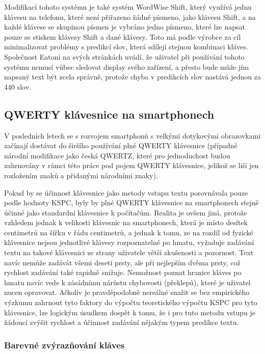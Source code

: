 \documentclass{article}
\begin{document}
Modifikací tohoto systému je také systém WordWise Shift, který využívá jednu klávesu na telefonu, které není přiřazeno žádné písmeno, jako klávesu Shift, a na každé klávese se skupinou písmen je vybráno jedno písmeno, které lze napsat pouze se stiskem klávesy Shift a dané klávesy. Toto má podle výrobce za cíl minimalizovat problémy s predikcí slov, která sdílejí stejnou kombinaci kláves. Společnost Eatoni na svých stránkách uvádí, že uživatel při používání tohoto systému nemusí vůbec sledovat display svého zařízení, a přesto bude může jím napsaný text být zcela správně, protože chyba v predikcích slov nastává jednou za 440 slov. \cite{Ward2012} 

\subsection{QWERTY klávesnice na smartphonech}

V posledních letech se s rozvojem smartphonů s velkými dotykovými obrazovkami začínají dostávat do širšího používání plné QWERTY klávesnice (případně národní modifikace jako česká QWERTZ, které pro jednoduchost budou zahrnovány v rámci této práce pod pojem QWERTY klávesnice, jelikož se liší jen rozložením znaků a přidanými národními znaky). 

Pokud by se účinnost klávesnice jako metody vstupu textu porovnávala pouze podle hodnoty KSPC, byly by plné QWERTY klávesnice na smartphonech stejně účinné jako standardní klávesnice k počítačům. Realita je ovšem jiná, protože vzhledem jednak k velikosti klávesnic na smartphonech, která je místo desítek centimetrů na šířku v řádu centimetrů, a jednak k tomu, ze na rozdíl od fyzické klávesnice nejsou jednotlivé klávesy rozpoznatelné po hmatu, vyžaduje zadávání textu na takové klávesnici ze strany uživatele větší zkušenosti a pozornost. Text navíc nemůže zadávát všemi deseti prsty, ale při nejlepším dvěma prsty, což rychlost zadávání také rapidně snižuje. Nemožnost poznat hranice kláves po hmatu navíc vede k zásádnímu nárůstu chybovosti (překlepů), které je uživatel nucen opravovat. Ačkoliv je pravděpodobně nereálné snažit se bez empirického výzkumu zahrnout tyto faktory do výpočtu teoretického výpočtu KSPC pro tyto klávesnice, lze logickým úsudkem dospět k tomu, že i pro tuto metodu vstupu je žádoucí zvýšit rychlost a účinnost zadávání nějakým typem predikce textu.

\subsubsection{Barevné zvýrazňování kláves}
\end{document}
